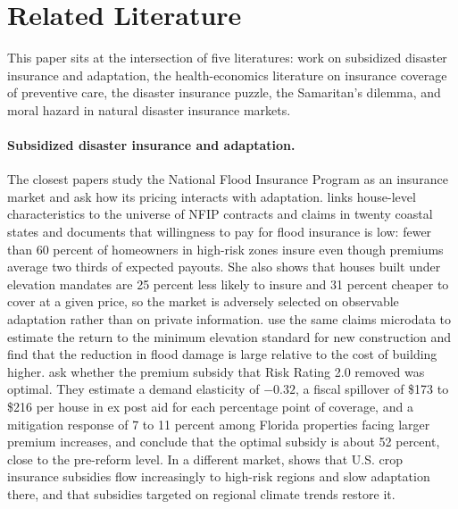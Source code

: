 
\section{Related Literature}

This paper sits at the intersection of five literatures: work on subsidized disaster insurance and adaptation, the health-economics literature on insurance coverage of preventive care, the disaster insurance puzzle, the Samaritan's dilemma, and moral hazard in natural disaster insurance markets.

\paragraph{Subsidized disaster insurance and adaptation.}
The closest papers study the National Flood Insurance Program as an insurance market and ask how its pricing interacts with adaptation. \citet{wagner2022} links house-level characteristics to the universe of NFIP contracts and claims in twenty coastal states and documents that willingness to pay for flood insurance is low: fewer than 60 percent of homeowners in high-risk zones insure even though premiums average two thirds of expected payouts. She also shows that houses built under elevation mandates are 25 percent less likely to insure and 31 percent cheaper to cover at a given price, so the market is adversely selected on observable adaptation rather than on private information. \citet{hovekampwagner2023} use the same claims microdata to estimate the return to the minimum elevation standard for new construction and find that the reduction in flood damage is large relative to the cost of building higher. \citet{grubersolomon2026} ask whether the premium subsidy that Risk Rating 2.0 removed was optimal. They estimate a demand elasticity of $-0.32$, a fiscal spillover of \$173 to \$216 per house in ex post aid for each percentage point of coverage, and a mitigation response of 7 to 11 percent among Florida properties facing larger premium increases, and conclude that the optimal subsidy is about 52 percent, close to the pre-reform level. In a different market, \citet{obolensky2024} shows that U.S. crop insurance subsidies flow increasingly to high-risk regions and slow adaptation there, and that subsidies targeted on regional climate trends restore it.

